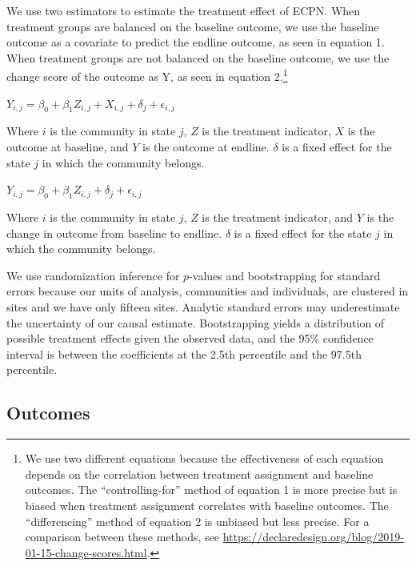 \documentclass[11pt]{article}
\begin{document}
We use two estimators to estimate the treatment effect of ECPN. When
treatment groups are balanced on the baseline outcome, we use the
baseline outcome as a covariate to predict the endline outcome, as seen
in equation 1. When treatment groups are not balanced on the baseline
outcome, we use the change score of the outcome as Y, as seen in
equation 2.\footnote{We use two different equations because the
  effectiveness of each equation depends on the correlation between
  treatment assignment and baseline outcomes. The ``controlling-for''
  method of equation 1 is more precise but is biased when treatment
  assignment correlates with baseline outcomes. The ``differencing''
  method of equation 2 is unbiased but less precise. For a comparison
  between these methods, see
  \url{https://declaredesign.org/blog/2019-01-15-change-scores.html}.}

\medskip

\(Y_{i,j} = \beta_0 + \beta_1Z_{i,j} + X_{i,j} + \delta_j + \epsilon_{i,j}\)

\medskip

\noindent Where \(i\) is the community in state \(j\), \(Z\) is the
treatment indicator, \(X\) is the outcome at baseline, and \(Y\) is the
outcome at endline. \(\delta\) is a fixed effect for the state \(j\) in
which the community belongs.

\medskip

\(Y_{i,j} = \beta_0 + \beta_1Z_{i,j} + \delta_j + \epsilon_{i,j}\)

\medskip

\noindent Where \(i\) is the community in state \(j\), \(Z\) is the
treatment indicator, and \(Y\) is the change in outcome from baseline to
endline. \(\delta\) is a fixed effect for the state \(j\) in which the
community belongs.

We use randomization inference for \(p\)-values and bootstrapping for
standard errors because our units of analysis, communities and
individuals, are clustered in sites and we have only fifteen sites.
Analytic standard errors may underestimate the uncertainty of our causal
estimate. Bootstrapping yields a distribution of possible treatment
effects given the observed data, and the 95\% confidence interval is
between the coefficients at the 2.5th percentile and the 97.5th
percentile.

\hypertarget{outcomes}{%
\subsection{Outcomes}\label{outcomes}}
\end{document}
